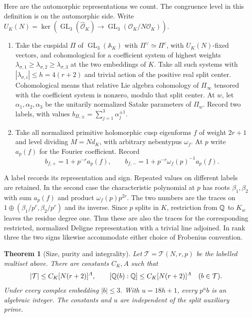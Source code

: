 \documentclass[a4paper,11pt]{article}
\newtheorem{theorem}[proposition]{Theorem}
\theoremstyle{definition}
\theoremstyle{remark}
\numberwithin{equation}{section}
\newcommand{\GL}{\operatorname{GL}}
\newcommand{\OO}{\mathcal O}
\begin{document}
Here are the automorphic representations we count. The congruence level in this definition is on the automorphic side. Write \(U_K(N)=\ker(\GL_3(\widehat{\OO}_K)\to\GL_3(\OO_K/N\OO_K))\).
\begin{enumerate}
\item Take the cuspidal \(\Pi\) of \(\GL_3(\mathbb A_K)\) with \(\Pi^\vee\simeq\Pi^c\), with \(U_K(N)\)-fixed vectors, and cohomological for a coefficient system of highest weights \(\lambda_{\sigma,1}\ge\lambda_{\sigma,2}\ge\lambda_{\sigma,3}\) at the two embeddings of \(K\). Take all such systems with \(|\lambda_{\sigma,i}|\le h=4(r+2)\) and trivial action of the positive real split center. Cohomological means that relative Lie algebra cohomology of \(\Pi_\infty\) tensored with the coefficient system is nonzero, modulo that split center. At \(w\), let \(\alpha_1,\alpha_2,\alpha_3\) be the unitarily normalized Satake parameters of \(\Pi_w\). Record two labels, with values \(b_{\Pi,\pm}=\sum_{j=1}^3\alpha_j^{\pm1}\).
\item Take all normalized primitive holomorphic cusp eigenforms \(f\) of weight \(2r+1\) and level dividing \(M=Nd_K\), with arbitrary nebentypus \(\omega_f\). At \(p\) write \(a_p(f)\) for the Fourier coefficient. Record
\[
        b_{f,+}=1+p^{-r}a_p(f),\qquad
        b_{f,-}=1+p^{-r}\omega_f(p)^{-1}a_p(f).
\]
\end{enumerate}
A label records its representation and sign. Repeated values on different labels are retained. In the second case the characteristic polynomial at \(p\) has roots \(\beta_1,\beta_2\) with sum \(a_p(f)\) and product \(\omega_f(p)p^{2r}\). The two numbers are the traces on \(1\oplus(\beta_1/p^r,\beta_2/p^r)\) and its inverse. Since \(p\) splits in \(K\), restriction from \(\mathbb Q\) to \(K_w\) leaves the residue degree one. Thus these are also the traces for the corresponding restricted, normalized Deligne representation with a trivial line adjoined. In rank three the two signs likewise accommodate either choice of Frobenius convention.

\begin{theorem}[Size, purity and integrality]\label{thm:traces}
Let \(\mathcal T=\mathcal T(N,r,p)\) be the labelled multiset above. There are constants \(C_K,A\) such that
\begin{equation}
 |\mathcal T|\le C_K[N(r+2)]^A,\qquad
 [\mathbb Q(b):\mathbb Q]\le C_K[N(r+2)]^A\quad(b\in\mathcal T).
 \label{eq:size}
\end{equation}
Under every complex embedding \(|b|\le3\). With \(u=18h+1\), every \(p^u b\) is an algebraic integer. The constants and \(u\) are independent of the split auxiliary prime.
\end{theorem}
\end{document}
